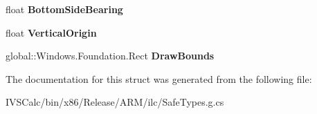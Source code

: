 \begin{DoxyCompactItemize}
float {\bfseries Bottom\+Side\+Bearing}
\item 
\mbox{\label{struct_microsoft_1_1_graphics_1_1_canvas_1_1_text_1_1_canvas_glyph_metrics_a4c5cca456aaba88051363af683f3d40e}} 
float {\bfseries Vertical\+Origin}
\item 
\mbox{\label{struct_microsoft_1_1_graphics_1_1_canvas_1_1_text_1_1_canvas_glyph_metrics_aabca951a1bc9d64bf3d0a2834e2516f7}} 
global\+::\+Windows.\+Foundation.\+Rect {\bfseries Draw\+Bounds}
\end{DoxyCompactItemize}


The documentation for this struct was generated from the following file\+:\begin{DoxyCompactItemize}
\item 
I\+V\+S\+Calc/bin/x86/\+Release/\+A\+R\+M/ilc/Safe\+Types.\+g.\+cs\end{DoxyCompactItemize}
